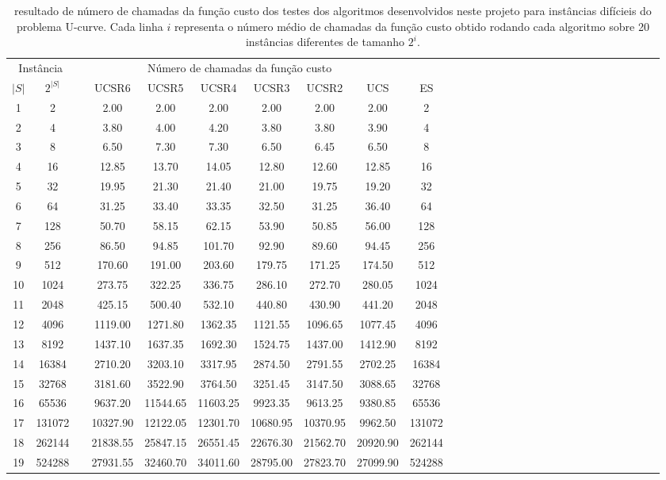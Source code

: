 \documentclass[12pt]{article}
\begin{document}
\begin{table}[ht] \begin{center} \begin{tabular}{@{}ccc ccc ccc ccc ccc ccc ccc ccc ccc cc@{}} \toprule
\multicolumn{2}{c}{Instância} & \multicolumn{7}{c}{Número de chamadas da função custo}\\
\cline{1-2}\cline{4-10} 
$|S|$ & $2^{|S|}$  && UCSR6 & UCSR5 & UCSR4 & UCSR3 & UCSR2 & UCS & ES \\ \hline
 1 &       2 &&  2.00 &  2.00 &  2.00 &  2.00 &  2.00 &  2.00 & 2 & \\ 
 2 &       4 &&  3.80 &  4.00 &  4.20 &  3.80 &  3.80 &  3.90 & 4 & \\ 
 3 &       8 &&  6.50 &  7.30 &  7.30 &  6.50 &  6.45 &  6.50 & 8 & \\ 
 4 &      16 &&  12.85 & 13.70 & 14.05 & 12.80 & 12.60 & 12.85 & 16 & \\ 
 5 &      32 &&  19.95 & 21.30 & 21.40 & 21.00 & 19.75 & 19.20 & 32 & \\ 
 6 &      64 &&  31.25 & 33.40 & 33.35 & 32.50 & 31.25 & 36.40 & 64 & \\ 
 7 &     128 &&  50.70 & 58.15 & 62.15 & 53.90 & 50.85 & 56.00 & 128 & \\ 
 8 &     256 &&  86.50 & 94.85 & 101.70 & 92.90 & 89.60 & 94.45 & 256 & \\ 
 9 &     512 &&  170.60 & 191.00 & 203.60 & 179.75 & 171.25 & 174.50 & 512 & \\ 
10 &    1024 &&  273.75 & 322.25 & 336.75 & 286.10 & 272.70 & 280.05 & 1024 & \\ 
11 &    2048 &&  425.15 & 500.40 & 532.10 & 440.80 & 430.90 & 441.20 & 2048 & \\ 
12 &    4096 &&  1119.00 & 1271.80 & 1362.35 & 1121.55 & 1096.65 & 1077.45 & 4096 & \\ 
13 &    8192 &&  1437.10 & 1637.35 & 1692.30 & 1524.75 & 1437.00 & 1412.90 & 8192 & \\ 
14 &   16384 &&  2710.20 & 3203.10 & 3317.95 & 2874.50 & 2791.55 & 2702.25 & 16384 & \\ 
15 &   32768 &&  3181.60 & 3522.90 & 3764.50 & 3251.45 & 3147.50 & 3088.65 & 32768 & \\ 
16 &   65536 &&  9637.20 & 11544.65 & 11603.25 & 9923.35 & 9613.25 & 9380.85 & 65536 & \\ 
17 &  131072 &&  10327.90 & 12122.05 & 12301.70 & 10680.95 & 10370.95 & 9962.50 & 131072 & \\ 
18 &  262144 &&  21838.55 & 25847.15 & 26551.45 & 22676.30 & 21562.70 & 20920.90 & 262144 & \\ 
19 &  524288 &&  27931.55 & 32460.70 & 34011.60 & 28795.00 & 27823.70 & 27099.90 & 524288 & \\ 
\bottomrule \end{tabular} \caption{resultado de número de chamadas da função custo dos testes dos algoritmos desenvolvidos neste projeto para instâncias difícieis do problema U-curve. Cada linha $i$ representa o número médio de chamadas da função custo obtido rodando cada algoritmo sobre 20 instâncias diferentes de tamanho $2^i$.} \label{tab:comparison:costfunction} \end{center} \end{table}
\end{document}
